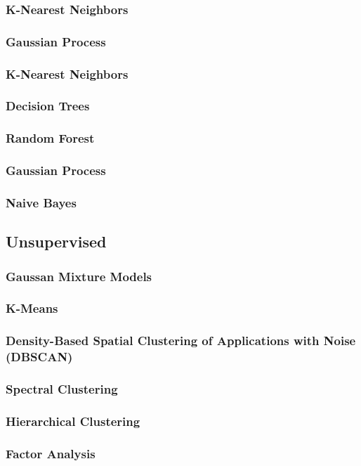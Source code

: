 \documentclass[11pt]{article}
\begin{document}
\subsubsection{K-Nearest Neighbors}
\subsubsection{Gaussian Process}
\subsubsection{K-Nearest Neighbors}
\subsubsection{Decision Trees}
\subsubsection{Random Forest}
\subsubsection{Gaussian Process}
\subsubsection{Naive Bayes}
\subsection{Unsupervised}
\subsubsection{Gaussan Mixture Models}
\subsubsection{K-Means}
\subsubsection{Density-Based Spatial Clustering of Applications with Noise (DBSCAN)}
\subsubsection{Spectral Clustering}
\subsubsection{Hierarchical Clustering}
\subsubsection{Factor Analysis}
\end{document}
